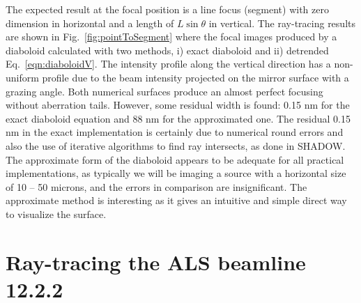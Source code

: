 \documentclass{iucr}              %
\begin{document}
The expected result at the focal position is a line focus (segment) with zero dimension in horizontal and a length of $L\sin\theta$ in vertical. The ray-tracing results are shown in Fig.~\ref{fig:pointToSegment} where the focal images produced by a diaboloid calculated with two methods, i) exact diaboloid and ii) detrended Eq.~\ref{eqn:diaboloidV}.
The intensity profile along the vertical direction has a non-uniform profile due to the beam intensity projected on the mirror surface with a grazing angle.
Both numerical surfaces produce an almost perfect focusing without aberration tails. However, some residual width is found: 0.15 nm for the exact diaboloid equation and 88 nm for the approximated one. 
The residual 0.15 nm in the exact implementation is certainly due to numerical round errors and also the use of iterative algorithms to find ray intersects, as done in SHADOW.
The approximate form of the diaboloid appears to be adequate for all practical implementations, as typically we will be imaging a source with a horizontal size of 10 – 50 microns, and the errors in comparison are insignificant.  The approximate method is interesting as it gives an intuitive and simple direct way to visualize the surface.

\section{Ray-tracing the ALS beamline 12.2.2}
\label{sec:beamline}
\end{document}
